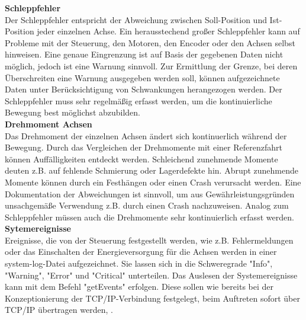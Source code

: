 \documentclass[ a4paper,
                oneside,
                toc=bibliography,
                toc=listof
                ]{scrbook}
\begin{document}
 	\textbf{Schleppfehler}\\
 	Der Schleppfehler entspricht der Abweichung zwischen Soll-Position und Ist-Position jeder einzelnen Achse. Ein herausstechend großer Schleppfehler kann auf Probleme mit der Steuerung, den Motoren, den Encoder oder den Achsen selbst hinweisen. Eine genaue Eingrenzung ist auf Basis der gegebenen Daten nicht möglich, jedoch ist eine Warnung sinnvoll. Zur Ermittlung der Grenze, bei deren Überschreiten eine Warnung ausgegeben werden soll, können aufgezeichnete Daten unter Berücksichtigung von Schwankungen herangezogen werden. Der Schleppfehler muss sehr regelmäßig erfasst werden, um die kontinuierliche Bewegung best möglichst abzubilden.\\
 	\textbf{Drehmoment Achsen}\\
 	Das Drehmoment der einzelnen Achsen ändert sich kontinuerlich während der Bewegung. Durch das Vergleichen der Drehmomente mit einer Referenzfahrt können  Auffälligkeiten entdeckt werden. Schleichend zunehmende Momente deuten z.B. auf fehlende Schmierung oder Lagerdefekte hin. Abrupt zunehmende Momente können durch ein Festhängen oder einen Crash verursacht werden. Eine Dokumentation der Abweichungen ist sinnvoll, um aus Gewährleistungsgründen unsachgemäße Verwendung z.B. durch einen Crash nachzuweisen. Analog zum Schleppfehler müssen auch die Drehmomente sehr kontinuierlich erfasst werden.\\
	\textbf{Sytemereignisse}\\
	Ereignisse, die von der Steuerung festgestellt werden, wie z.B. Fehlermeldungen oder das Einschalten der Energieversorgung für die Achsen werden in einer system-log-Datei aufgezeichnet. Sie lassen sich in die Schweregrade "Info", "Warning", "Error" und "Critical" unterteilen. Das Auslesen der Systemereignisse kann mit dem Befehl "getEvents" erfolgen. Diese sollen wie bereits bei der Konzeptionierung der TCP/IP-Verbindung festgelegt, beim Auftreten sofort über TCP/IP übertragen werden, .
	\newpage
\end{document}

